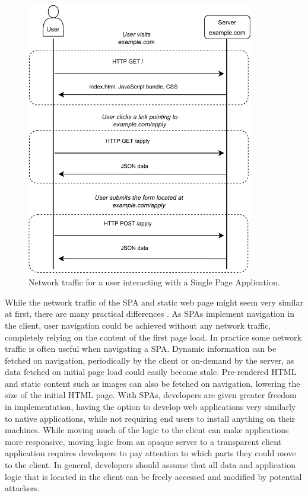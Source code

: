 \begin{figure}[b]
	\centering
	\includegraphics[height=120mm]{assets/spa_http_request.drawio.pdf}
	\caption{Network traffic for a user interacting with a Single Page Application.}
	\label{spa}
\end{figure}

While the network traffic of the SPA and static web page might seem very similar at first, there are many practical differences \citep{fink_introducing_2014}.
As SPAs implement navigation in the client, user navigation could be achieved without any network traffic, completely relying on the content of the first page load.
In practice some network traffic is often useful when navigating a SPA. 
Dynamic information can be fetched on navigation, periodically by the client or on-demand by the server, as data fetched on initial page load could easily become stale.
Pre-rendered HTML and static content such as images can also be fetched on navigation, lowering the size of the initial HTML page.
With SPAs, developers are given greater freedom in implementation, having the option to develop web applications very similarly to native applications, while not requiring end users to install anything on their machines.
While moving much of the logic to the client can make applications more responsive, moving logic from an opaque server to a transparent client application requires developers to pay attention to which parts they could move to the client.
In general, developers should assume that all data and application logic that is located in the client can be freely accessed and modified by potential attackers.

